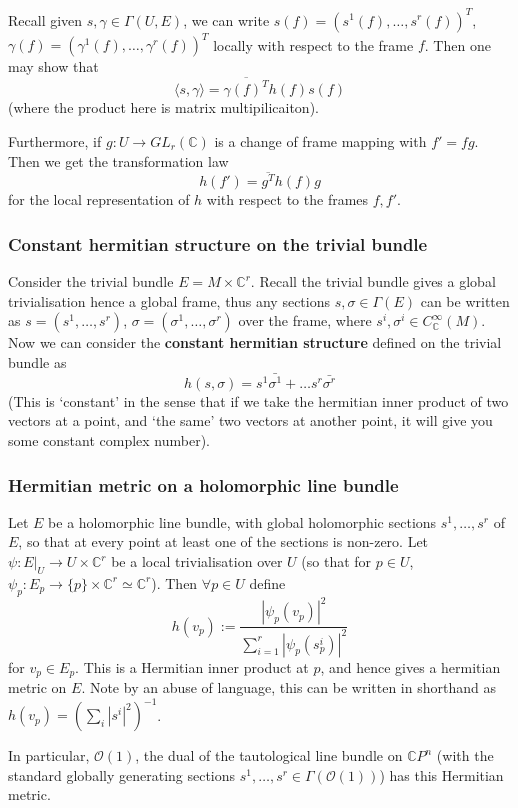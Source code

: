 \documentclass[a4paper]{article}
\theoremstyle{definition} \newtheorem*{definition}{Definition}
\theoremstyle{definition} \newtheorem*{definitions}{Definitions}
\theoremstyle{plain} \newtheorem{theorem}{Theorem}[section]
\theoremstyle{plain} \newtheorem{proposition}[theorem]{Proposition}
\theoremstyle{plain} \newtheorem{corollary}[theorem]{Corollary}
\theoremstyle{plain} \newtheorem{lemma}[theorem]{Lemma}
\theoremstyle{plain} \newtheorem{example}[theorem]{Example}
\newcommand{\defn}[1]{\textbf{#1}}
\newcommand{\complexnos}{\mathbb{C}}
\newcommand{\smooth}{C^\infty}
\begin{document}
Recall given $s, \gamma\in \Gamma(U, E)$, we can write $s(f)=(s^1(f), \ldots, s^r(f))^T$, $\gamma(f)=(\gamma^1(f), \ldots, \gamma^r(f))^T$ locally with respect to the frame $f$. Then one may show that 
$$\langle s, \gamma \rangle = \overline{\gamma(f)^T}h(f)s(f)$$
(where the product here is matrix multipilicaiton).

Furthermore, if $g:U\to GL_r(\complexnos)$ is a change of frame mapping with $f'=fg$. Then we get the transformation law
$$h(f')=\overline{g^T}h(f)g$$
for the local representation of $h$ with respect to the frames $f, f'$.

\subsubsection{Constant hermitian structure on the trivial bundle}
Consider the trivial bundle $E=M\times \complexnos^r$. Recall the trivial bundle gives a global trivialisation hence a global frame, thus any sections $s, \sigma \in \Gamma(E)$ can be written as  $s=(s^1, \ldots, s^r)$, $\sigma=(\sigma^1, \ldots, \sigma^r)$ over the frame, where $s^i, \sigma^i \in \smooth_\complexnos (M)$. Now we can consider the \defn{constant hermitian structure} defined on the trivial bundle as
$$h(s, \sigma)=s^1\bar{\sigma^1} + \ldots s^r\bar{\sigma^r}$$
(This is `constant' in the sense that if we take the hermitian inner product of two vectors at a point, and `the same' two vectors at another point, it will give you some constant complex number). 

\subsubsection{Hermitian metric on a holomorphic line bundle}
Let $E$ be a holomorphic line bundle, with global holomorphic sections $s^1, \ldots, s^r$ of $E$, so that at every point at least one of the sections is non-zero. Let $\psi:E|_U\to U\times \complexnos^r$ be a local trivialisation over $U$ (so that for $p\in U$, $\psi_p:E_p\to \{p\}\times \complexnos^r \simeq \complexnos^r$). Then $\forall p\in U$ define
$$h(v_p):=\frac{|\psi_p(v_p)|^2}{\sum_{i=1}^r |\psi_p (s^i_p)|^2}$$
for $v_p\in E_p$. This is a Hermitian inner product at $p$, and hence gives a hermitian metric on $E$. Note by an abuse of language, this can be written in shorthand as $h(v_p)=(\sum_i |s^i|^2)^{-1}$.

In particular, $\mathcal{O}(1)$, the dual of the tautological line bundle on $\complexnos P^n$ (with the standard globally generating sections $s^1, \dots, s^r\in \Gamma(\mathcal{O}(1))$) has this Hermitian metric.
\end{document}
